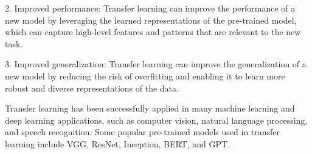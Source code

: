 2. Improved performance: Transfer learning can improve the performance of a new model by leveraging the learned representations of the pre-trained model, which can capture high-level features and patterns that are relevant to the new task.

3. Improved generalization: Transfer learning can improve the generalization of a new model by reducing the risk of overfitting and enabling it to learn more robust and diverse representations of the data.

Transfer learning has been successfully applied in many machine learning and deep learning applications, such as computer vision, natural language processing, and speech recognition. Some popular pre-trained models used in transfer learning include VGG, ResNet, Inception, BERT, and GPT.

